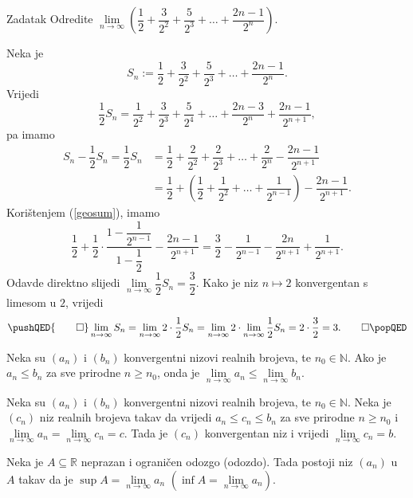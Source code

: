 \begin{exercise}{Zadatak}
Odredite \(\lim\limits_{n\to \infty}\left(\dfrac{1}{2}+\dfrac{3}{2^2}+\dfrac{5}{2^3}+\dots+\dfrac{2n-1}{2^n}\right)\).
\end{exercise}
\begin{proof*}
Neka je
\[S_n:=\dfrac{1}{2}+\dfrac{3}{2^2}+\dfrac{5}{2^3}+\dots+\dfrac{2n-1}{2^n}.\]
Vrijedi
\[\dfrac{1}{2}S_n=\dfrac{1}{2^2}+\dfrac{3}{2^3}+\dfrac{5}{2^4}+\dots+\dfrac{2n-3}{2^{n}}+\dfrac{2n-1}{2^{n+1}},\]
pa imamo
\begin{align*}
S_n-\dfrac{1}{2}S_n=\dfrac{1}{2}S_n&=\dfrac{1}{2}+\dfrac{2}{2^2}+\dfrac{2}{2^3}+\dots+\dfrac{2}{2^n}-\dfrac{2n-1}{2^{n+1}}\\
&=\dfrac{1}{2}+\left(\dfrac{1}{2}+\dfrac{1}{2^2}+\dots+\dfrac{1}{2^{n-1}}\right)-\dfrac{2n-1}{2^{n+1}}.
\end{align*}
Korištenjem (\ref{geosum}), imamo
\[\dfrac{1}{2}+\dfrac{1}{2}\cdot\dfrac{1-\dfrac{1}{2^{n-1}}}{1-\dfrac{1}{2}}-\dfrac{2n-1}{2^{n+1}}=\dfrac{3}{2}-\dfrac{1}{2^{n-1}}-\dfrac{2n}{2^{n+1}}+\dfrac{1}{2^{n+1}}.\]
Odavde direktno slijedi \(\lim\limits_{n\to \infty}{\dfrac{1}{2}S_n}=\dfrac{3}{2}\). Kako je niz \(n\mapsto 2\) konvergentan s limesom u \(2\), vrijedi
\[
\pushQED{\qed}
\lim\limits_{n\to \infty}{S_n}=\lim\limits_{n\to \infty}{2\cdot \dfrac{1}{2}S_n}=\lim\limits_{n\to \infty}{2}\cdot \lim\limits_{n\to \infty}{\dfrac{1}{2}S_n}=2\cdot \dfrac{3}{2}=3.\qedhere
\popQED
\]
\end{proof*}
\begin{remark}
\label{limitpreservesordering}
Neka su \((a_n)\) i \((b_n)\) konvergentni nizovi realnih brojeva, te \(n_0\in \mathbb{N}\). Ako je \(a_n\leq b_n\) za sve prirodne \(n\geq n_0\), onda je \(\lim\limits_{n\to \infty}{a_n}\leq \lim\limits_{n\to \infty}{b_n}\).
\end{remark}
\begin{remark} 
Neka su \((a_n)\) i \((b_n)\) konvergentni nizovi realnih brojeva, te \(n_0\in \mathbb{N}\). Neka je \((c_n)\) niz realnih brojeva takav da vrijedi \(a_n\leq c_n\leq b_n\) za sve prirodne \(n\geq n_0\) i \(\lim\limits_{n\to \infty}{a_n}=\lim\limits_{n\to \infty}{c_n}=c\). Tada je \((c_n)\) konvergentan niz i vrijedi \(\lim\limits_{n\to \infty}{c_n}=b\).
\end{remark}
\begin{remark}
\label{supinflimitpoint}
Neka je $A\subseteq \mathbb{R}$ neprazan i ograničen odozgo (odozdo). Tada postoji niz $(a_n)$ u $A$ takav da je $\sup{A}=\lim\limits_{n\to \infty}{a_n}$ $\left(\inf{A}=\lim\limits_{n\to \infty}{a_n}\right)$.
\end{remark}
